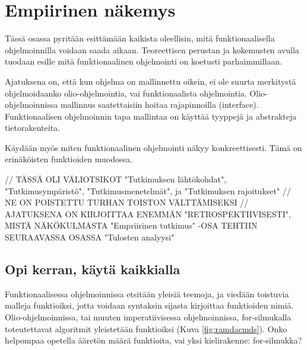 \vspace{21.5pt}
\chapter{Empiirinen näkemys}

Tässä osassa pyritään esittämään kaikista oleellisin, mitä funktionaalisella ohjelmoinnilla voidaan saada aikaan. Teoreettisen perustan ja kokemusten avulla tuodaan esille mitä funktionaalinen ohjelmointi on koetusti parhaimmillaan.

Ajatuksena on, että kun ohjelma on mallinnettu oikein, ei ole suurta merkitystä ohjelmoidaanko olio-ohjelmointia, vai funktionaalista ohjelmointia. Olio-ohjelmoinnissa mallinnus saatettaisiin hoitaa rajapinnoilla (interface). Funktionaalisen ohjelmoinnin tapa mallintaa on käyttää tyyppejä ja abstrakteja tietorakenteita.

Käydään myös miten funktionaalinen ohjelmointi näkyy konkreettisesti. Tämä on erinäköisten funktioiden muodossa.

// TÄSSÄ OLI VÄLIOTSIKOT "Tutkimuksen lähtökohdat", "Tutkimusympäristö", "Tutkimusmenetelmät", ja "Tutkimuksen rajoitukset"
// NE ON POISTETTU TURHAN TOISTON VÄLTTÄMISEKSI
// AJATUKSENA ON KIRJOITTAA ENEMMÄN "RETROSPEKTIIVISESTI", MISTÄ NÄKÖKULMASTA "Empriirinen tutkimus" -OSA TEHTIIN SEURAAVASSA OSASSA "Tulosten analyysi"


\section{Opi kerran, käytä kaikkialla}

Funktionaalisessa ohjelmoinnissa etsitään yleisiä teemoja, ja viedään toistuvia malleja funktioiksi, jotta voidaan syntaksin sijasta kirjoittaa funktioiden nimiä. Olio-ohjelmoinnissa, tai muuten imperatiivisessa ohjelmoinnissa, for-silmukalla toteutettavat algoritmit yleistetään funktioiksi (Kuva \ref{fig:ramdacmds}). Onko helpompaa opetella ääretön määrä funktioita, vai yksi kielirakenne: for-silmukka?

